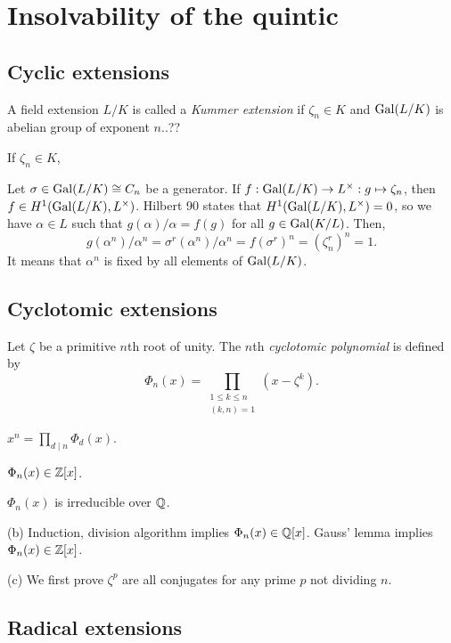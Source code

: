 \documentclass{../../large}
\begin{document}
\chapter{Insolvability of the quintic}


\section{Cyclic extensions}



\begin{prb}
A field extension $L/K$ is called a \emph{Kummer extension} if $\zeta_n\in K$ and $\operatorname{Gal}(L/K)$ is abelian group of exponent $n$..??
\begin{parts}
\item If $\zeta_n\in K$, 
\end{parts}
\end{prb}
Let $\sigma\in\operatorname{Gal}(L/K)\cong C_n$ be a generator.
If $f:\operatorname{Gal}(L/K)\to L^\times:g\mapsto\zeta_n$, then $f\in H^1(\operatorname{Gal}(L/K),L^\times)$.
Hilbert 90 states that $H^1(\operatorname{Gal}(L/K),L^\times)=0$, so we have $\alpha\in L$ such that $g(\alpha)/\alpha=f(g)$ for all $g\in\operatorname{Gal}(K/L)$.
Then,
\[g(\alpha^n)/\alpha^n=\sigma^r(\alpha^n)/\alpha^n=f(\sigma^r)^n=(\zeta_n^r)^n=1.\]
It means that $\alpha^n$ is fixed by all elements of $\operatorname{Gal}(L/K)$.


\section{Cyclotomic extensions}

\begin{prb}
Let $\zeta$ be a primitive $n$th root of unity.
The $n$th \emph{cyclotomic polynomial} is defined by
\[\Phi_n(x)=\prod_{\substack{1\le k\le n\\(k,n)=1}}(x-\zeta^k).\]
\begin{parts}
\item $x^n=\prod_{d\mid n}\Phi_d(x)$.
\item $\Phi_n(x)\in\mathbb{Z}[x]$.
\item $\Phi_n(x)$ is irreducible over $\mathbb{Q}$.
\end{parts}
\end{prb}
\begin{pf}

(b)
Induction, division algorithm implies $\Phi_n(x)\in\mathbb{Q}[x]$.
Gauss' lemma implies $\Phi_n(x)\in\mathbb{Z}[x]$.

(c)
We first prove $\zeta^p$ are all conjugates for any prime $p$ not dividing $n$.
\end{pf}

\begin{prb}

\end{prb}






\section{Radical extensions}
\end{document}
